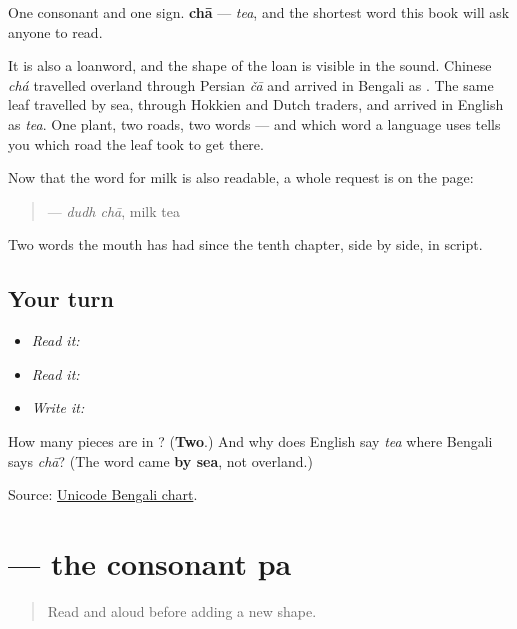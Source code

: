 One consonant and one sign. \textbf{chā} — \emph{tea}, and the shortest word this book will ask anyone to read.

It is also a loanword, and the shape of the loan is visible in the sound. Chinese \emph{chá} travelled overland through Persian \emph{čā} and arrived in Bengali as \textbf{}. The same leaf travelled by sea, through Hokkien and Dutch traders, and arrived in English as \emph{tea}. One plant, two roads, two words — and which word a language uses tells you which road the leaf took to get there.

Now that the word for milk is also readable, a whole request is on the page:

\begin{quote}
\textbf{ } — \emph{dudh chā}, milk tea
\end{quote}

Two words the mouth has had since the tenth chapter, side by side, in script.

\subsection*{Your turn}
\begin{itemize}
\raggedright
  \item \emph{Read it:} 
  \item \emph{Read it:}  
  \item \emph{Write it:} 
\end{itemize}

\begin{tcolorbox}[breakable,colback=teal!4,colframe=teal!35!black,title={Before you move on}]
How many pieces are in \textbf{}? (\textbf{Two}.) And why does English say \emph{tea} where Bengali says \emph{chā}? (The word came \textbf{by sea}, not overland.)

Source: \href{https://www.unicode.org/charts/PDF/U0980.pdf}{Unicode Bengali chart}.
\end{tcolorbox}
\section[pô]{ — the consonant pa}

\label{lesson:BN-W04-pa}



\begin{quote}
Read \textbf{} and \textbf{ } aloud before adding a new shape.
\end{quote}

